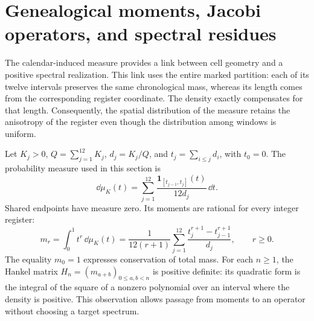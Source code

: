 \section{Genealogical moments, Jacobi operators, and spectral residues}
\label{sec:jacobi-generated}

The calendar-induced measure provides a link between cell geometry and
a positive spectral realization. This link uses the entire marked
partition: each of its twelve intervals preserves the same chronological
mass, whereas its length comes from the corresponding register
coordinate. The density exactly compensates for that length.
Consequently, the spatial distribution of the measure retains the
anisotropy of the register even though the distribution among windows
is uniform.

Let \(K_j>0\), \(Q=\sum_{j=1}^{12}K_j\), \(d_j=K_j/Q\), and
\(t_j=\sum_{i\leq j}d_i\), with \(t_0=0\). The probability measure
used in this section is
\[
 \dd\mu_K(t)=\sum_{j=1}^{12}
 \frac{\mathbf1_{[t_{j-1},t_j]}(t)}{12d_j}\,\dd t.
\]
Shared endpoints have measure zero. Its moments are rational for
every integer register:
\begin{equation}
 m_r=\int_0^1t^r\,\dd\mu_K(t)
 =\frac1{12(r+1)}\sum_{j=1}^{12}
   \frac{t_j^{r+1}-t_{j-1}^{r+1}}{d_j},\qquad r\geq0.
 \label{eq:jacobi-moments}
\end{equation}
The equality \(m_0=1\) expresses conservation of total mass. For
each \(n\geq1\), the Hankel matrix \(H_n=(m_{a+b})_{0\leq a,b<n}\)
is positive definite: its quadratic form is the integral of the square
of a nonzero polynomial over an interval where the density is positive.
This observation allows passage from moments to an operator without
choosing a target spectrum.

